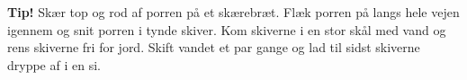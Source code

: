 \begin{notes}
    \textbf{Tip!} Skær top og rod af porren på et skærebræt. Flæk porren på langs hele vejen igennem og snit porren i tynde skiver. Kom skiverne i en stor skål med vand og rens skiverne fri for jord. Skift vandet et par gange og lad til sidst skiverne dryppe af i en si.
\end{notes}

\setcounter{step}{0}
\setcounter{substep}{0}

\clearpage

